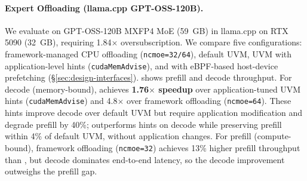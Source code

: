 \paragraph{Expert Offloading (llama.cpp GPT-OSS-120B).}
We evaluate \sys on GPT-OSS-120B MXFP4 MoE (59~GB) in llama.cpp on RTX 5090 (32~GB), requiring 1.84$\times$ oversubscription.
We compare five configurations: framework-managed CPU offloading (\texttt{ncmoe=\allowbreak{}32/64}), default UVM, UVM with application-level hints (\texttt{cuda\-Mem\-Advise}), and \sys with eBPF-based host-device prefetching (\S\ref{sec:design-interfaces}).
 shows prefill and decode throughput.
For decode (memory-bound), \sys achieves \textbf{1.76$\times$ speedup} over application-tuned UVM hints (\texttt{cuda\-Mem\-Advise}) and 4.8$\times$ over framework offloading (\texttt{ncmoe=64}).
These hints improve decode over default UVM but require application modification and degrade prefill by 40\%; \sys outperforms hints on decode while preserving prefill within 4\% of default UVM, without application changes.
For prefill (compute-bound), framework offloading (\texttt{ncmoe=32}) achieves 13\% higher prefill throughput than \sys{}, but decode dominates end-to-end latency, so the decode improvement outweighs the prefill gap.%

